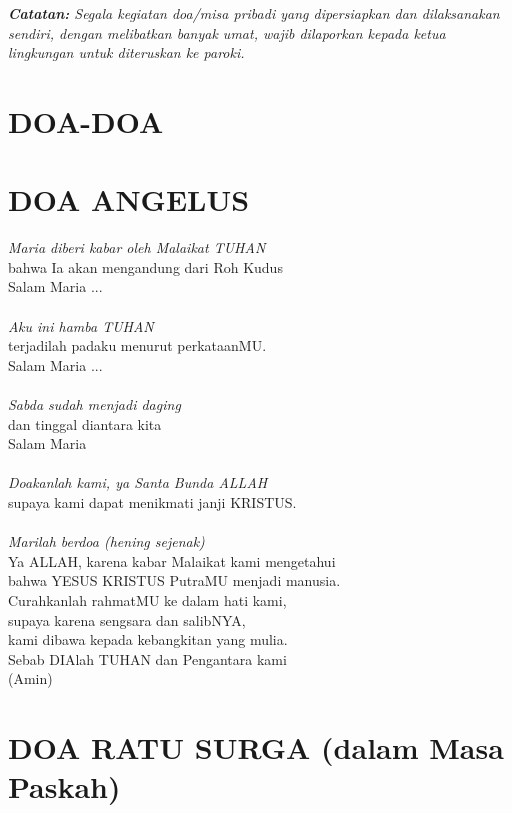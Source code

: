 \documentclass[a5paper,titlepage,11pt]{book}
\begin{document}
{\it {\bf Catatan:} Segala kegiatan doa/misa pribadi yang dipersiapkan dan dilaksanakan sendiri, dengan melibatkan banyak umat, wajib dilaporkan kepada ketua lingkungan untuk diteruskan ke paroki.}%
%
%
\section*{\large DOA-DOA}
\section{DOA ANGELUS}

\emph{Maria diberi kabar oleh Malaikat TUHAN} \\
bahwa Ia akan mengandung dari Roh Kudus \\
Salam Maria ...\\ \\
\emph{Aku ini hamba TUHAN}\\
terjadilah padaku menurut perkataanMU.\\
Salam Maria ... \\ \\
\emph{Sabda sudah menjadi daging}\\
dan tinggal diantara kita\\
Salam Maria\\ \\
\emph{Doakanlah kami, ya Santa Bunda ALLAH}\\
supaya kami dapat menikmati janji KRISTUS.\\ \\

\emph{Marilah berdoa (hening sejenak)}\\
Ya ALLAH, karena kabar Malaikat kami mengetahui\\
bahwa YESUS KRISTUS PutraMU menjadi manusia.\\
Curahkanlah rahmatMU ke dalam hati kami,\\
supaya karena sengsara dan salibNYA,\\
kami dibawa kepada kebangkitan yang mulia.\\
Sebab DIAlah TUHAN dan Pengantara kami \\
(Amin)\\

\section{DOA RATU SURGA (dalam Masa Paskah)}
\end{document}
